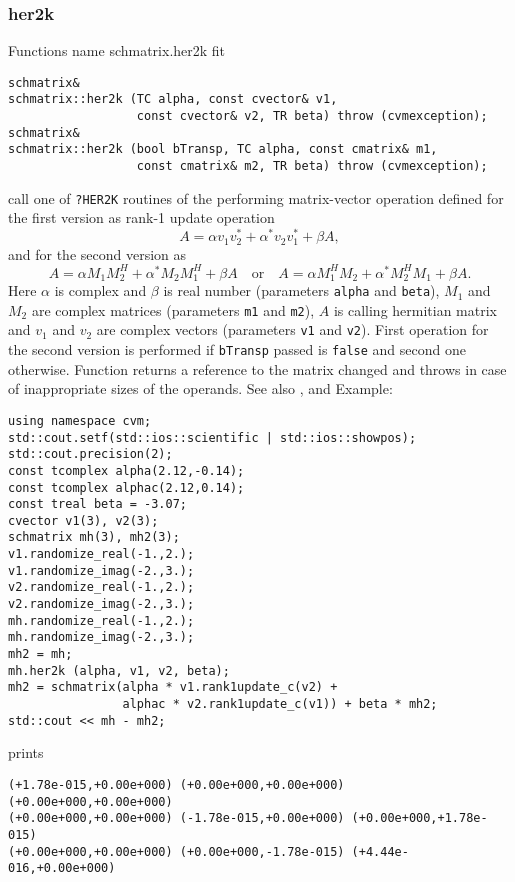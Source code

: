 \subsubsection{her2k}
Functions%
\pdfdest name {schmatrix.her2k} fit
\begin{verbatim}
schmatrix& 
schmatrix::her2k (TC alpha, const cvector& v1, 
                  const cvector& v2, TR beta) throw (cvmexception);
schmatrix& 
schmatrix::her2k (bool bTransp, TC alpha, const cmatrix& m1, 
                  const cmatrix& m2, TR beta) throw (cvmexception);
\end{verbatim}
call one of \verb"?HER2K" routines of the
performing  matrix-vector operation defined for the first version as
rank-1 update operation
\begin{equation*}
A=\alpha v_1 v_2^* + \alpha^* v_2 v_1^* + \beta A,
\end{equation*}
and for the second version as
\begin{equation*}
A=\alpha M_1 M_2^H + \alpha^* M_2 M_1^H + \beta A\quad
\text{or}\quad 
A=\alpha M_1^H M_2 + \alpha^* M_2^H M_1 + \beta A.
\end{equation*}
Here $\alpha$ is complex and $\beta$ is real number
(parameters \verb"alpha" and \verb"beta"),
$M_1$ and $M_2$ are complex matrices (parameters \verb"m1" and \verb"m2"),
$A$ is  calling hermitian matrix
and $v_1$ and $v_2$ are complex vectors (parameters \verb"v1" and \verb"v2").
First operation for the second version 
is performed if \verb"bTransp" passed
is \verb"false" and second one otherwise.
Function
returns a reference to the matrix changed and throws
in case of inappropriate sizes of the operands.
See also
,
 and 
Example:
\begin{Verbatim}
using namespace cvm;
std::cout.setf(std::ios::scientific | std::ios::showpos); 
std::cout.precision(2);
const tcomplex alpha(2.12,-0.14);
const tcomplex alphac(2.12,0.14);
const treal beta = -3.07;
cvector v1(3), v2(3);
schmatrix mh(3), mh2(3);
v1.randomize_real(-1.,2.);
v1.randomize_imag(-2.,3.);
v2.randomize_real(-1.,2.);
v2.randomize_imag(-2.,3.);
mh.randomize_real(-1.,2.);
mh.randomize_imag(-2.,3.);
mh2 = mh;
mh.her2k (alpha, v1, v2, beta);
mh2 = schmatrix(alpha * v1.rank1update_c(v2) + 
                alphac * v2.rank1update_c(v1)) + beta * mh2;
std::cout << mh - mh2;
\end{Verbatim}
prints
\begin{Verbatim}
(+1.78e-015,+0.00e+000) (+0.00e+000,+0.00e+000) (+0.00e+000,+0.00e+000)
(+0.00e+000,+0.00e+000) (-1.78e-015,+0.00e+000) (+0.00e+000,+1.78e-015)
(+0.00e+000,+0.00e+000) (+0.00e+000,-1.78e-015) (+4.44e-016,+0.00e+000)
\end{Verbatim}
